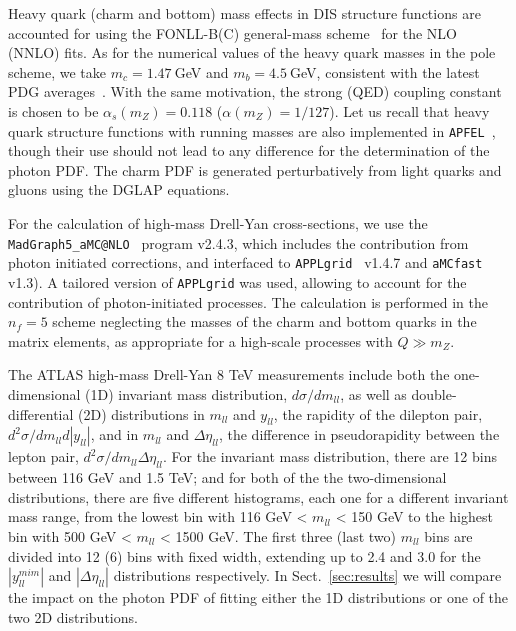 Heavy quark (charm and bottom) mass effects in DIS structure functions are accounted
for using the FONLL-B(C) general-mass scheme~\cite{Forte:2010ta}
for the NLO (NNLO) fits.
%
As for the numerical values of the heavy quark masses in the pole scheme,
we take  $m_c=1.47~$GeV and $m_b=4.5~$GeV, consistent with the latest
PDG averages~\cite{Agashe:2014kda}.
%
With the same motivation, the strong (QED) coupling constant is chosen to be  $\alpha_s(m_Z)=0.118$
($\alpha(m_Z)=1/127$).
%
Let us recall that heavy quark structure functions with running masses
are also implemented in {\tt APFEL}~\cite{Bertone:2016ywq},
though their use should not lead to any difference for the determination of the photon PDF.
%
The charm PDF is generated perturbatively from light quarks and gluons using
the DGLAP equations.

For the calculation of high-mass Drell-Yan cross-sections,
we use the {\tt MadGraph5{\_}aMC@NLO}~\cite{Alwall:2014hca} program  v2.4.3,
which includes the contribution from photon initiated corrections,
and interfaced to {\tt APPLgrid}~\cite{Carli:2010rw} v1.4.7
and {\tt aMCfast}~\cite{amcfast} v1.3).
%
A tailored version of  {\tt APPLgrid} was used, allowing to account for
the contribution of photon-initiated processes.
%
The calculation is performed in the $n_f=5$ scheme neglecting the masses of the charm
and bottom quarks in the matrix elements, as appropriate for a high-scale processes
with $Q \gg m_Z$.

The ATLAS high-mass Drell-Yan 8 TeV measurements include both the one-dimensional (1D)
invariant mass distribution, $d\sigma/dm_{ll}$, as well as double-differential (2D)
distributions in $m_{ll}$ and $y_{ll}$, the rapidity of the dilepton pair,
$d^{2}\sigma/dm_{ll}d|y_{ll}|$, and in $m_{ll}$ and $\Delta\eta_{ll}$,
  the difference in 
  pseudorapidity between the lepton pair, $d^{2}\sigma/dm_{ll}\Delta\eta_{ll}$.
  For the invariant mass 
  distribution, there are 12 bins between 116 GeV and 1.5 TeV; and for both of the 
 the two-dimensional distributions, there are five different histograms, each one for a different invariant
 mass range, from the lowest bin
 with 116 GeV < $m_{ll}$ < 150 GeV to the highest bin with 500 GeV < $m_{ll}$ < 1500 GeV.
 The first three (last two) $m_{ll}$ bins are divided into 12 (6) bins with fixed
 width, extending up to 2.4 and 3.0 for the  $|y_{ll}^{mim}|$ and $|\Delta\eta_{ll}|$ distributions
 respectively.
 In Sect.~\ref{sec:results} we will compare the impact on the photon PDF of fitting either
 the 1D distributions or one of the two 2D distributions.

